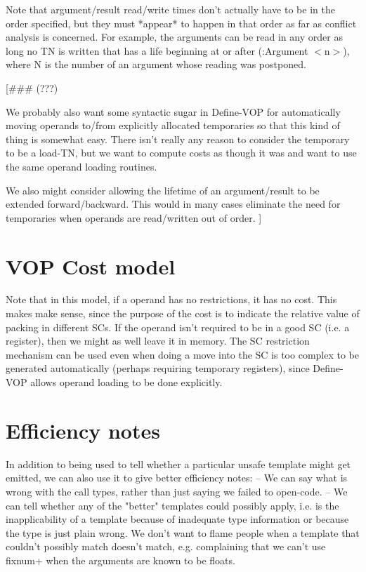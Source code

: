 Note that argument/result read/write times don't actually have to be in the
order specified, but they must *appear* to happen in that order as far as
conflict analysis is concerned.  For example, the arguments can be read in any
order as long no TN is written that has a life beginning at or after
(:Argument $<$n$>$), where N is the number of an argument whose reading was
postponed.

[\#\#\# (???)

We probably also want some syntactic sugar in Define-VOP for automatically
moving operands to/from explicitly allocated temporaries so that this kind of
thing is somewhat easy.  There isn't really any reason to consider the
temporary to be a load-TN, but we want to compute costs as though it was and
want to use the same operand loading routines.

We also might consider allowing the lifetime of an argument/result to be
extended forward/backward.  This would in many cases eliminate the need for
temporaries when operands are read/written out of order.
]


\section{VOP Cost model}

Note that in this model, if a operand has no restrictions, it has no cost.
This makes make sense, since the purpose of the cost is to indicate the
relative value of packing in different SCs.  If the operand isn't required to
be in a good SC (i.e. a register), then we might as well leave it in memory.
The SC restriction mechanism can be used even when doing a move into the SC is
too complex to be generated automatically (perhaps requiring temporary
registers), since Define-VOP allows operand loading to be done explicitly.


\section{Efficiency notes}

  In addition to
being used to tell whether a particular unsafe template might get emitted, we
can also use it to give better efficiency notes:
 -- We can say what is wrong with the call types, rather than just saying we
    failed to open-code.
 -- We can tell whether any of the "better" templates could possibly apply,
    i.e. is the inapplicability of a template because of inadequate type
    information or because the type is just plain wrong.  We don't want to
    flame people when a template that couldn't possibly match doesn't match,
    e.g. complaining that we can't use fixnum+ when the arguments are known to
    be floats.


